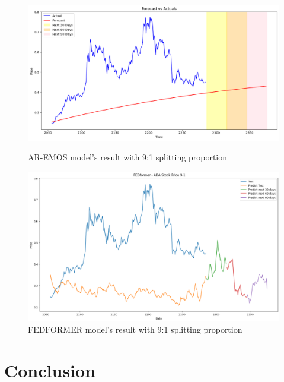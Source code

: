 \documentclass{ieeeojies}
\begin{document}
\begin{figure}[H]
    \centering
    \begin{minipage}{0.23\textwidth}
    \centering
    \includegraphics[width=1\textwidth]{bibliography/Figure/PREDICT/ADA_AR-EMOS_9-1.png}
    \caption{AR-EMOS model's result with 9:1 splitting proportion}
    \label{fig10}
    \end{minipage}
    \hfill
    \begin{minipage}{0.23\textwidth}
    \centering
    \includegraphics[width=1\textwidth]{bibliography/fed 91.png}
    \caption{FEDFORMER model's result with 9:1 splitting proportion}
    \label{fig11}
    \end{minipage}
\end{figure}
\section{Conclusion}
\end{document}

